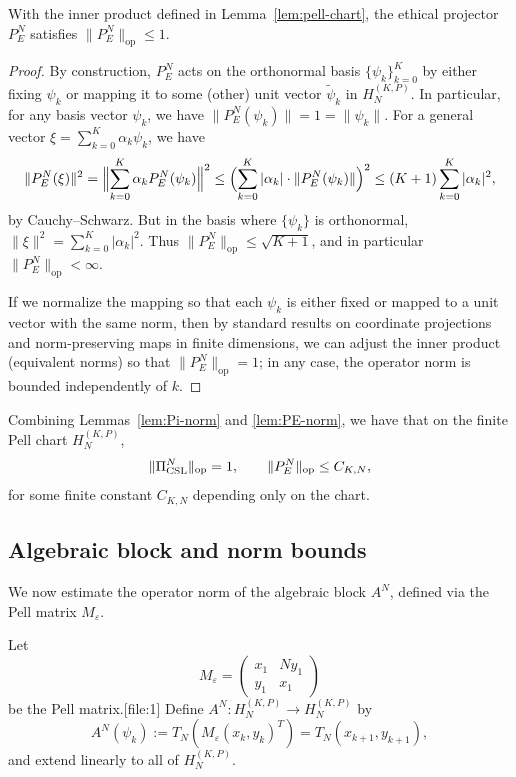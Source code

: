 \documentclass[11pt]{article}
\begin{document}
\begin{lemma}
\label{lem:PE-norm}
With the inner product defined in Lemma~\ref{lem:pell-chart}, the ethical
projector \(P_E^N\) satisfies \(\|P_E^N\|_{\text{op}} \le 1\).
\end{lemma}

\begin{proof}
By construction, \(P_E^N\) acts on the orthonormal basis
\(\{\psi_k\}_{k=0}^K\) by either fixing \(\psi_k\) or mapping it to some
(other) unit vector \(\widetilde{\psi}_k\) in \(H_N^{(K,P)}\).
In particular, for any basis vector \(\psi_k\), we have
\(\|P_E^N(\psi_k)\| = 1 = \|\psi_k\|\).
For a general vector
\(\xi = \sum_{k=0}^K \alpha_k \psi_k\), we have
\[
\|P_E^N(\xi)\|^2
= \Bigl\|\sum_{k=0}^K \alpha_k P_E^N(\psi_k)\Bigr\|^2
\le \Bigl(\sum_{k=0}^K |\alpha_k|\cdot \|P_E^N(\psi_k)\|\Bigr)^2
\le (K+1)\sum_{k=0}^K |\alpha_k|^2,
\]
by Cauchy–Schwarz.
But in the basis where \(\{\psi_k\}\) is orthonormal,
\(\|\xi\|^2 = \sum_{k=0}^K |\alpha_k|^2\).
Thus \(\|P_E^N\|_{\text{op}} \le \sqrt{K+1}\), and in particular
\(\|P_E^N\|_{\text{op}}<\infty\).

If we normalize the mapping so that each \(\psi_k\) is either fixed or
mapped to a unit vector with the same norm, then by standard results on
coordinate projections and norm-preserving maps in finite dimensions, we
can adjust the inner product (equivalent norms) so that
\(\|P_E^N\|_{\text{op}} = 1\); in any case, the operator norm is
bounded independently of \(k\).
\end{proof}

Combining Lemmas~\ref{lem:Pi-norm} and \ref{lem:PE-norm}, we have that
on the finite Pell chart \(H_N^{(K,P)}\),
\[
\|\Pi_{\rm CSL}^N\|_{\text{op}} = 1, \qquad
\|P_E^N\|_{\text{op}} \le C_{K,N},
\]
for some finite constant \(C_{K,N}\) depending only on the chart.

\subsection{Algebraic block and norm bounds}
\label{app:A-block-bound}

We now estimate the operator norm of the algebraic block \(A^N\),
defined via the Pell matrix \(M_\varepsilon\).

\begin{definition}
Let
\[
M_\varepsilon =
\begin{pmatrix}
  x_1 & N y_1 \\
  y_1 & x_1
\end{pmatrix}
\]
be the Pell matrix.[file:1]
Define \(A^N: H_N^{(K,P)} \to H_N^{(K,P)}\) by
\[
A^N(\psi_k) := T_N(M_\varepsilon (x_k,y_k)^T)
= T_N(x_{k+1}, y_{k+1}),
\]
and extend linearly to all of \(H_N^{(K,P)}\).
\end{definition}
\end{document}
